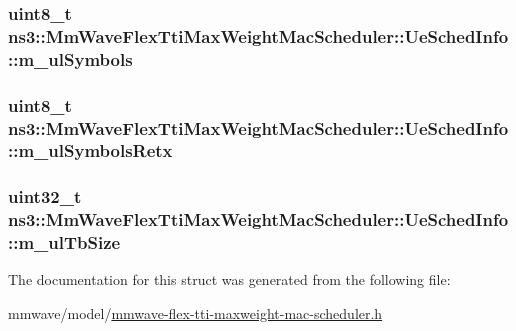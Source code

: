 \subsubsection[{\texorpdfstring{m\+\_\+ul\+Symbols}{m_ulSymbols}}]{\setlength{\rightskip}{0pt plus 5cm}uint8\+\_\+t ns3\+::\+Mm\+Wave\+Flex\+Tti\+Max\+Weight\+Mac\+Scheduler\+::\+Ue\+Sched\+Info\+::m\+\_\+ul\+Symbols}\hypertarget{structns3_1_1MmWaveFlexTtiMaxWeightMacScheduler_1_1UeSchedInfo_a55743a5b8bf580e51e677f4d0c0aa2ae}{}\label{structns3_1_1MmWaveFlexTtiMaxWeightMacScheduler_1_1UeSchedInfo_a55743a5b8bf580e51e677f4d0c0aa2ae}
\subsubsection[{\texorpdfstring{m\+\_\+ul\+Symbols\+Retx}{m_ulSymbolsRetx}}]{\setlength{\rightskip}{0pt plus 5cm}uint8\+\_\+t ns3\+::\+Mm\+Wave\+Flex\+Tti\+Max\+Weight\+Mac\+Scheduler\+::\+Ue\+Sched\+Info\+::m\+\_\+ul\+Symbols\+Retx}\hypertarget{structns3_1_1MmWaveFlexTtiMaxWeightMacScheduler_1_1UeSchedInfo_a6d29c36db89a738db53c61d36d4599fe}{}\label{structns3_1_1MmWaveFlexTtiMaxWeightMacScheduler_1_1UeSchedInfo_a6d29c36db89a738db53c61d36d4599fe}
\subsubsection[{\texorpdfstring{m\+\_\+ul\+Tb\+Size}{m_ulTbSize}}]{\setlength{\rightskip}{0pt plus 5cm}uint32\+\_\+t ns3\+::\+Mm\+Wave\+Flex\+Tti\+Max\+Weight\+Mac\+Scheduler\+::\+Ue\+Sched\+Info\+::m\+\_\+ul\+Tb\+Size}\hypertarget{structns3_1_1MmWaveFlexTtiMaxWeightMacScheduler_1_1UeSchedInfo_abe34b2449f0be4993a150dc9ef007b1b}{}\label{structns3_1_1MmWaveFlexTtiMaxWeightMacScheduler_1_1UeSchedInfo_abe34b2449f0be4993a150dc9ef007b1b}


The documentation for this struct was generated from the following file\+:\begin{DoxyCompactItemize}
\item 
mmwave/model/\hyperlink{mmwave-flex-tti-maxweight-mac-scheduler_8h}{mmwave-\/flex-\/tti-\/maxweight-\/mac-\/scheduler.\+h}\end{DoxyCompactItemize}

